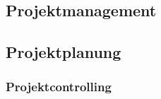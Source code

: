 
\clearpage
{}
\recalctypearea
\begin{flushleft}
    \chapter{Projektmanagement}
    \section{Projektplanung}
    \subsection{Projektcontrolling}
    
\end{flushleft}

